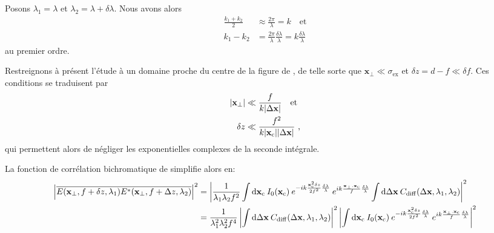 Posons $\lambda_1=\lambda$ et $\lambda_2=\lambda+\delta\lambda$. Nous avons alors
\begin{align}
\frac{k_1+k_2}{2} &\approx \frac{2\pi}{\lambda} =k \quad \text{et}\\
k_1-k_2 &= \frac{2\pi}{\lambda} \frac{\delta\lambda}{\lambda} = k \frac{\delta\lambda}{\lambda}
\end{align}
au premier ordre.

Restreignons à présent l'étude à un domaine proche du centre de la figure de \speckle , de telle sorte que $\mathbf{x}_{\perp}\ll\sigma_{\mathrm{ex}}$ et $\delta z=d-f \ll \delta f$. Ces conditions se traduisent par 
\begin{align}
|\mathbf{x}_{\perp}| &\ll \frac{f}{k |\Delta\mathbf{x}|}  \quad\text{et}\\
\delta z &\ll \frac{f^2}{k|\mathbf{x}_{\mathrm{c}}||\Delta\mathbf{x}|} \text{ ,}
\end{align}
qui permettent alors de négliger les exponentielles complexes de la seconde intégrale.

La fonction de corrélation bichromatique de simplifie alors en:
\begin{align}
\left| \overline{E(\mathbf{x}_{\perp},f+\delta z,\lambda_1)E^*(\mathbf{x}_{\perp},f+\Delta z,\lambda_2)} \right|^2 &= \left| \frac{1}{\lambda_1 \lambda_2 f^2} \int{\mathop{}\mathopen{}\mathrm{d}\mathbf{x}_{\mathrm{c}}\: I_0(\mathbf{x}_{\mathrm{c}}) \: e^{-ik\frac{\mathbf{x}_{\mathrm{c}}^2 \delta z}{2f^2} \frac{\delta\lambda}{\lambda}} \: e^{ik \frac{\mathbf{x}_{\perp}.\mathbf{x}_{\mathrm{c}}}{f}\frac{\delta\lambda}{\lambda}}} \int{\mathop{}\mathopen{}\mathrm{d}\Delta\mathbf{x}\: C_{\mathrm{diff}}(\Delta\mathbf{x},\lambda_1,\lambda_2)} \right|^2 \\
&= \frac{1}{\lambda_1^2 \lambda_2^2 f^4} \left| \int{\mathop{}\mathopen{}\mathrm{d}\Delta\mathbf{x}\: C_{\mathrm{diff}}(\Delta\mathbf{x},\lambda_1,\lambda_2)} \right|^2 \left|\int{\mathop{}\mathopen{}\mathrm{d}\mathbf{x}_{\mathrm{c}}\: I_0(\mathbf{x}_{\mathrm{c}}) \: e^{-ik\frac{\mathbf{x}_{\mathrm{c}}^2 \delta z}{2f^2} \frac{\delta\lambda}{\lambda}} \: e^{ik\frac{\mathbf{x}_{\perp}.\mathbf{x}_{\mathrm{c}}}{f}\frac{\delta\lambda}{\lambda}}} \right|^2
\end{align}

